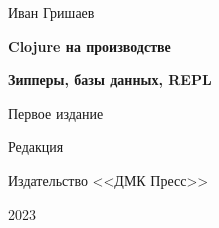 
\begin{titlepage}

\begin{center}

  {Иван Гришаев}

  \vspace*{5cm}

  {\Large\textbf{Clojure на производстве}}

  \vspace{1mm}

  {\Large\textbf{Зипперы, базы данных, REPL}}

  \vspace{7mm}

  {\Large Первое издание}

  {\small Редакция \COMMITHASH}

  \vspace*{\fill}

  \ifdmk
  Издательство <<ДМК Пресс>>
  \fi

  {2023}

\end{center}

\end{titlepage}
